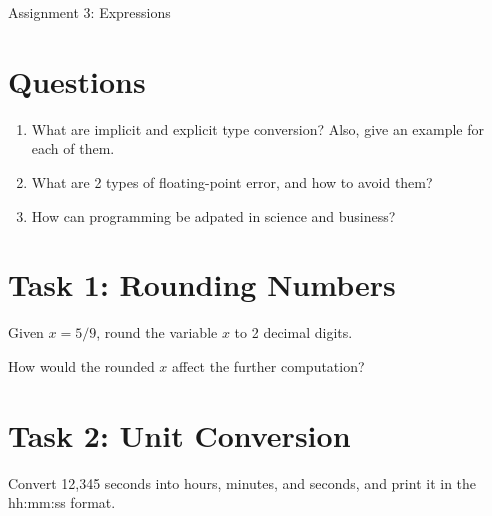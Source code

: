 \documentclass[11pt]{article}
\begin{document}
\begin{center}
    \Large{Assignment 3: Expressions}
\end{center}

\section*{Questions}

\begin{enumerate}
    \item {
        What are implicit and explicit type conversion? Also, give an example for each of them.
        \begin{tcolorbox}[colback=black!10!white, colframe=black!75!white, title=\textbf{Answer}]
            \vspace{5cm}
        \end{tcolorbox}
    }
    \item {
        What are 2 types of floating-point error, and how to avoid them?
        \begin{tcolorbox}[colback=black!10!white, colframe=black!75!white, title=\textbf{Answer}]
            \vspace{5cm}
        \end{tcolorbox}
    }
    \item {
        How can programming be adpated in science and business?  
        \begin{tcolorbox}[colback=black!10!white, colframe=black!75!white, title=\textbf{Answer}]
            \vspace{5cm}    
        \end{tcolorbox}
    }
\end{enumerate}

\section*{Task 1: Rounding Numbers}
Given $x = 5/9$, round the variable \(x\) to 2 decimal digits.
\begin{tcolorbox}[colback=black!10!white, colframe=black!75!white, title=\textbf{Answer}]
    \vspace{5cm}
\end{tcolorbox}
How would the rounded \(x\) affect the further computation?
\begin{tcolorbox}[colback=black!10!white, colframe=black!75!white, title=\textbf{Answer}]
    \vspace{5cm}
\end{tcolorbox}

\section*{Task 2: Unit Conversion}
Convert 12,345 seconds into hours, minutes, and seconds, and print it in the hh:mm:ss format.
\begin{tcolorbox}[colback=black!10!white, colframe=black!75!white, title=\textbf{Answer}]
    \vspace{5cm}
\end{tcolorbox}
\end{document}
